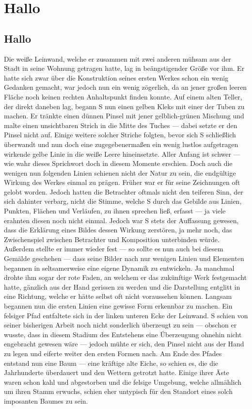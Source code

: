 \documentclass{article}
\begin{document}
\chapter{Hallo}\par
\section{Hallo}
\par
%
Die weiße Leinwand, welche er zusammen mit zwei anderen mühsam aus der Stadt in seine Wohnung getragen hatte, lag in beängstigender Größe vor ihm. Er hatte sich zwar über die Konstruktion seines ersten Werkes schon ein wenig Gedanken gemacht, war jedoch nun ein wenig zögerlich, da an jener großen leeren Fläche noch keinen rechten Anhaltspunkt finden konnte. Auf einem alten Teller, der direkt daneben lag, begann S nun einen gelben Kleks mit einer der Tuben zu machen. Er tränkte einen dünnen Pinsel mit jener gelblich-grünen Mischung und malte einen unsichtbaren Strich in die Mitte des Tuches --- dabei setzte er den Pinsel nicht auf. Einige weitere solcher Striche folgten, bevor sich S schließlich überwandt und nun doch eine zugegebenermaßen ein wenig lustlos aufgetragen wirkende gelbe Linie in die weiße Leere hineinsetzte. Aller Anfang ist schwer --- wie wahr dieses Sprichwort doch in diesem Momente erschien. Doch auch die wenigen nun folgenden Linien schienen nicht der Natur zu sein, die endgültige Wirkung des Werkes einmal zu prägen.
Früher war er für seine Zeichnungen oft gelobt worden. Jedoch hatten die Betrachter oftmals nicht den teiferen Sinn, der sich dahinter verbarg, nicht die Stimme, welche S durch das Gebilde aus Linien, Punkten, Flächen und Verläufen, zu ihnen sprechen ließ, erfasst --- ja viele erahnten diesen noch nicht einmal.
Jedoch war S stets der Auffassung gewesen, dass die Erklärung eines Bildes dessen Wirkung zerstören, ja mehr noch, das Zwischenspiel zwischen Betrachter und Komposition unterbinden würde. Außerdem stellte er immer wieder fest --- so sollte es nun auch bei diesem Gemälde geschehen --- dass seine Bilder nach nur wenigen Linien und Elementen begannen in seltsamerweise eine eigene Dynamik zu entwickeln. Ja manchmal drohte ihm sogar der rote Faden, an welchem er das zukünftige Werk festgemacht hatte, gänzlich aus der Hand gerissen zu werden und die Darstellung entglitt in eine Richtung, welche er hätte selbst oft nicht voraussehen können.
Langsam begannen nun die ersten Linien eine gewisse Form erkennbar zu machen. Ein felsiger Pfad entfaltete sich in der linken unteren Ecke der Leinwand.
S schien von seiner bisherigen Arbeit noch nicht sonderlich überzeugt zu sein --- obschon er wusste, dass in diesem Stadium des Entstehens eine Überzeugung ohnehin nicht engebracht gewesen wäre --- jedoch mühte er sich, den Pinsel nicht aus der Hand zu legen und eiferte weiter den ersten Formen nach.
Am Ende des Pfades entstand nun eine Baum --- eine kräftige alte Eiche, so schien es, die die Jahrhunderte überdauert und den Wettern getrotzt hatte. Einige ihrer Äste waren schon kahl und abgestorben und die felsige Umgebung, welche allmählich um ihren Stamm erwuchs, schien eher untypisch für den Standort eines solch imposanten Baumes zu sein.
\end{document}
